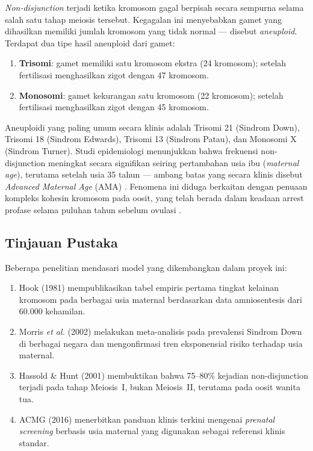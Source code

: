\documentclass[10pt,a4paper,twocolumn]{article}
\begin{document}
\textit{Non-disjunction} terjadi ketika kromosom gagal berpisah secara sempurna selama
salah satu tahap meiosis tersebut. Kegagalan ini menyebabkan gamet yang dihasilkan
memiliki jumlah kromosom yang tidak normal --- disebut \textit{aneuploid}.
Terdapat dua tipe hasil aneuploid dari gamet:

\begin{enumerate}[leftmargin=*,noitemsep,topsep=2pt]
    \item \textbf{Trisomi}: gamet memiliki satu kromosom ekstra (24 kromosom);
        setelah fertilisasi menghasilkan zigot dengan 47 kromosom.
    \item \textbf{Monosomi}: gamet kekurangan satu kromosom (22 kromosom);
        setelah fertilisasi menghasilkan zigot dengan 45 kromosom.
\end{enumerate}

Aneuploidi yang paling umum secara klinis adalah Trisomi 21 (Sindrom Down),
Trisomi 18 (Sindrom Edwards), Trisomi 13 (Sindrom Patau), dan Monosomi X (Sindrom Turner).
Studi epidemiologi menunjukkan bahwa frekuensi non-disjunction meningkat secara signifikan
seiring pertambahan usia ibu (\textit{maternal age}), terutama setelah usia 35 tahun ---
ambang batas yang secara klinis disebut \textit{Advanced Maternal Age} (AMA)
\cite{hook1981,hassold2001}. Fenomena ini diduga berkaitan dengan penuaan
kompleks kohesin kromosom pada oosit, yang telah berada dalam keadaan arrest
profase selama puluhan tahun sebelum ovulasi \cite{hunt2008}.

\subsection{Tinjauan Pustaka}

Beberapa penelitian mendasari model yang dikembangkan dalam proyek ini:

\begin{enumerate}[leftmargin=*,noitemsep,topsep=2pt]
    \item Hook (1981) mempublikasikan tabel empiris pertama tingkat kelainan kromosom
        pada berbagai usia maternal berdasarkan data amniosentesis dari 60.000 kehamilan.
    \item Morris \textit{et al.} (2002) melakukan meta-analisis pada prevalensi Sindrom Down
        di berbagai negara dan mengonfirmasi tren eksponensial risiko terhadap usia maternal.
    \item Hassold \& Hunt (2001) membuktikan bahwa 75--80\% kejadian non-disjunction
        terjadi pada tahap Meiosis~I, bukan Meiosis~II, terutama pada oosit wanita tua.
    \item ACMG (2016) menerbitkan panduan klinis terkini mengenai \textit{prenatal screening}
        berbasis usia maternal yang digunakan sebagai referensi klinis standar.
\end{enumerate}
\end{document}

